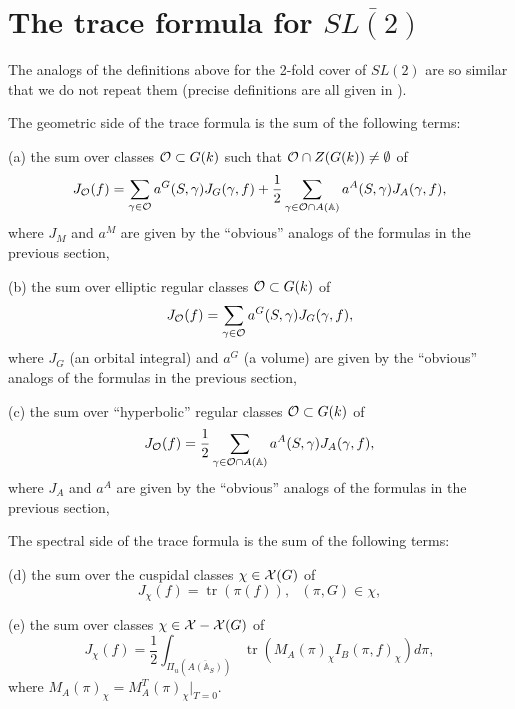 \documentclass[12pt,letterpaper]{book}
\theoremstyle{plain}
\theoremstyle{definition}
\theoremstyle{remark}
\theoremstyle{remark}
\newcommand{\tr}{\operatorname{tr}}
\begin{document}
\section{The trace formula for \texorpdfstring{$\overline{SL(2)}$}{SL(2)-bar}}

The analogs of the definitions above for the 2-fold cover of $SL(2)$
are so similar that we do not repeat them (precise definitions
are all given in \cite{J2}).

The geometric side of the trace formula is the sum of the following terms:

(a) the sum over classes ${\cal{O}}\subset G(k)$
such that ${\cal{O}}\cap Z(G(k))\not= \emptyset$ of
\begin{equation}
J_{\cal{O}}(f)=
\sum_{\gamma\in {\cal O}}
a^G(S,\gamma)J_G(\gamma,f)+{\frac{1}{2}}
\sum_{\gamma\in {\cal O}\cap A({\mathbb A})}
a^A(S,\gamma)J_A(\gamma,f),
\end{equation}
where $J_M$ and $a^M$
are given by the ``obvious'' analogs of the formulas
in the previous section,

(b) the sum over elliptic regular classes ${\cal{O}}\subset G(k)$
of
\begin{equation}
J_{\cal{O}}(f)=
\sum_{\gamma\in {\cal O}}
a^G(S,\gamma)J_G(\gamma,f),
\end{equation}
where $J_G$ (an orbital integral) and $a^G$ (a volume)
are given by the ``obvious'' analogs of the formulas
in the previous section,

(c) the sum over ``hyperbolic'' regular classes
${\cal{O}}\subset G(k)$
of
\begin{equation}
J_{\cal{O}}(f)=
{\frac{1}{2}}\sum_{\gamma\in {\cal O}\cap A({\mathbb A})}
a^A(S,\gamma)J_A(\gamma,f),
\end{equation}
where $J_A$ and $a^A$
are given by the ``obvious'' analogs of the formulas
in the previous section,

The spectral side of the trace formula is the sum of the following terms:

(d) the sum over the cuspidal classes $\chi\in {\cal{X}}(G)$ of
\begin{equation}
J_\chi(f)=
\tr(\pi(f)),\ \ \ (\pi,G)\in\chi,
\end{equation}

(e) the sum over classes $\chi\in {\cal{X}}-{\cal{X}}(G)$ of
\begin{equation}
J_\chi(f)=
{\frac{1}{2}}\int_{\Pi_u(\overline{A({\mathbb{A}}_S)})}
\tr(M_A(\pi)_\chi I_B(\pi,f)_\chi)d\pi,
\end{equation}
where $M_A(\pi)_\chi =M_A^T(\pi)_\chi|_{T=0}$.
\end{document}
